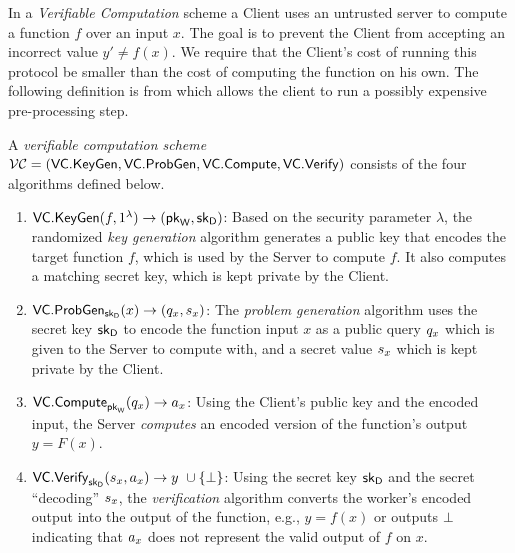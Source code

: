 In a {\em Verifiable Computation} scheme a Client uses an untrusted server to compute a function $f$ over an input $x$. The goal is to prevent the Client from accepting an incorrect value $y'\neq f(x)$. We require that the Client's cost of running this protocol be smaller than the cost of computing the function on his own. The following definition is from \cite{ggp10} which allows the client to run a possibly expensive pre-processing step. 

\begin{definition}

A \emph{verifiable computation scheme} ${\cal VC} =
(\mathsf{VC.KeyGen},\mathsf{VC.ProbGen},\mathsf{VC.Compute},\mathsf{VC.Verify})$ consists of the four
algorithms defined below.  

\begin{enumerate}
\item $\mathsf{VC.KeyGen}(f, 1^\lambda) \to (\mathsf{pk}_{\mathsf{W}}, \mathsf{sk}_{\mathsf{D}})$: 
      Based on the security parameter $\lambda$, the randomized \emph{key generation} 
      algorithm generates a public key that encodes the target function $f$, 
      which is used by the Server to compute $f$. It also 
      computes a matching secret key, which is kept private by the Client. 

\item $\mathsf{VC.ProbGen}_{\mathsf{sk}_{\mathsf{D}}}(x) \to (q_x,s_x)$:
      The \emph{problem generation} algorithm uses the secret key $\mathsf{sk}_{\mathsf{D}}$ to encode the 
      function input $x$ as a public query $q_x$ which is given to the Server
      to compute with, and a secret value $s_x$ 
      which is kept private by the Client. 

\item $\mathsf{VC.Compute}_{\mathsf{pk}_{\mathsf{W}}}(q_x) \to a_x$: 
      Using the Client's public key and the encoded input, the Server  \emph{computes} 
      an encoded version of the function's output $y = F(x)$. 

\item $\mathsf{VC.Verify}_{\mathsf{sk}_{\mathsf{D}}}(s_x,a_x) \to y\mbox{ }\cup \{ \bot \}$:
      Using the secret key $\mathsf{sk}_{\mathsf{D}}$ and the secret ``decoding'' $s_x$, the 
      \emph{verification} algorithm converts the worker's encoded output into 
      the output of the function, e.g., $y = f(x)$ or outputs $\bot$ indicating
      that $a_x$ does not represent the valid output of $f$ on $x$.
\end{enumerate}      


\end{definition}
